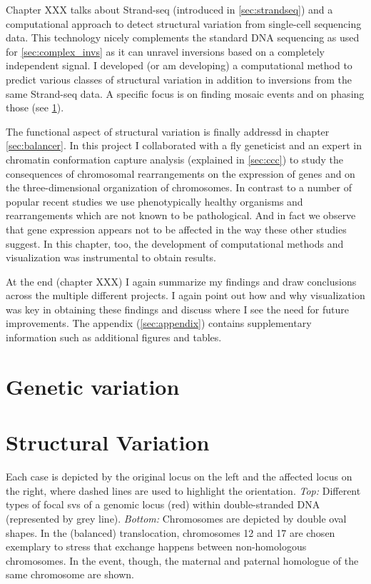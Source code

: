 Chapter XXX  talks about Strand-seq (introduced in \cref{sec:strandseq})
and a computational approach to detect structural variation from single-cell
sequencing data. This technology nicely complements the standard DNA sequencing
as used for \cref{sec:complex_invs} as it can unravel inversions based on a
completely independent signal. I developed (or am developing) a computational
method to predict various classes of structural variation in addition to
inversions from the same Strand-seq data. A specific focus is on finding
mosaic events and on phasing those (see \cref{sec:variation}).

The functional aspect of structural variation is finally addressd in chapter
\cref{sec:balancer}. In this project I collaborated with a fly geneticist and an
expert in chromatin conformation capture analysis (explained in \cref{sec:ccc})
to study the consequences of chromosomal rearrangements on the expression of
genes and on the three-dimensional organization of chromosomes. In contrast to
a number of popular recent studies we use phenotypically healthy organisms and
rearrangements which are not known to be pathological. And in fact we
observe that gene expression appears not to be affected in the way these other
studies suggest. In this chapter, too, the development of computational methods
and visualization was instrumental to obtain results.

At the end (chapter XXX) I again summarize my
findings and draw conclusions across the multiple different projects. I again
point out how and why visualization was key in obtaining these findings and
discuss where I see the need for future improvements. The appendix
(\cref{sec:appendix}) contains supplementary information such as additional
figures and tables.



\section{Genetic variation}
\label{sec:variation}



\section{Structural Variation}
\label{sec:sv}


    {Each case is depicted by the original locus on the left and the affected
    locus on the right, where dashed lines are used to highlight the orientation.
    \textit{Top:} Different types of focal \acp{sv} of a genomic locus (red)
    within double-stranded DNA (represented by grey line).  \textit{Bottom:}
    Chromosomes are depicted by double oval shapes. In the (balanced)
    translocation, chromosomes 12 and 17 are chosen exemplary to stress that
    exchange happens between non-homologous chromosomes. In the \loh event,
    though, the maternal and paternal homologue of the same chromosome are
    shown.}


